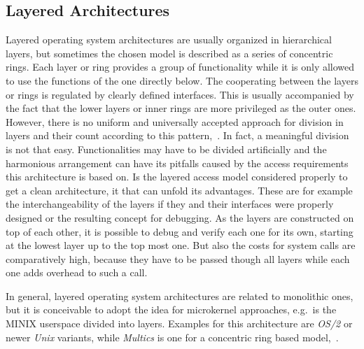 \subsection{Layered Architectures}
Layered operating system architectures are usually organized in hierarchical layers, but sometimes the chosen model is described as a series of concentric rings.
Each layer or ring provides a group of functionality while it is only allowed to use the functions of the one directly below. 
The cooperating between the layers or rings is regulated by clearly defined interfaces\cite{brause2017betriebssysteme}.
This is usually accompanied by the fact that the lower layers or inner rings are more privileged as the outer ones.
However, there is no uniform and universally accepted approach for division in layers and their count according to this pattern\cite{glatz2015betriebssysteme},~\cite{tanenbaum-modern-operating-systems}.
In fact, a meaningful division is not that easy.
Functionalities may have to be divided artificially and the harmonious arrangement can have its pitfalls caused by the access requirements this architecture is based on.
Is the layered access model considered properly to get a clean architecture, it that can unfold its advantages.
These are for example the interchangeability of the layers if they and their interfaces were properly designed or the resulting concept for debugging.
As the layers are constructed on top of each other, it is possible to debug  and verify each one for its own, starting at the lowest layer up to the top most one\cite{silberschatz2009operating}.
But also the costs for system calls are comparatively high, because they have to be passed though all layers while each one adds overhead to such a call\cite{silberschatz2009operating}.  

In general, layered operating system architectures are related to monolithic ones, but it is conceivable to adopt the idea for microkernel approaches, e.g.\ is the MINIX userspace divided into layers. 
Examples for this architecture are \textit{OS/2} or newer \textit{Unix} variants, while \textit{Multics} is one for a concentric ring based model\cite{glatz2015betriebssysteme},~\cite{tanenbaum-modern-operating-systems}.





